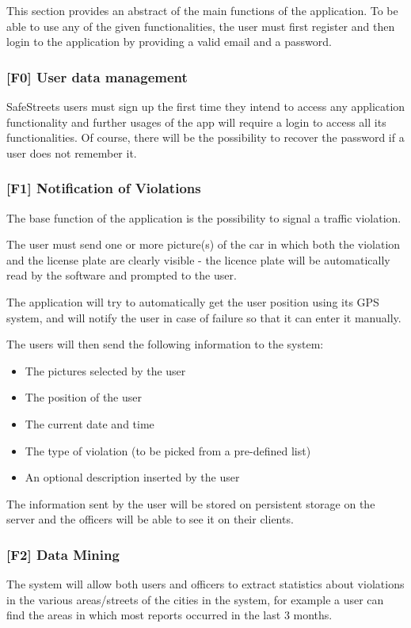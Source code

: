 This section provides an abstract of the main functions of the application. To be able to use any of the given functionalities, the user must first register and then login to the application by providing a valid email and a password.

\subsubsection[User data management]{[F0] User data management\hypertarget{sec:f0}{}}
SafeStreets users must sign up the first time they intend to access any application functionality and further usages of the app will require a login to access all its functionalities. Of course, there will be the possibility to recover the password if a user does not remember it.

\subsubsection[Notification of Violations]{[F1] Notification of Violations\hypertarget{sec:f1}{}}
\label{sec:notification_of_violations}
The base function of the application is the possibility to signal a traffic violation.

The user must send one or more picture(s) of the car in which both the violation and the license plate are clearly visible -
the licence plate will be automatically read by the software and prompted to the user.

The application will try to automatically get the user position using its GPS system, and will notify the user in case of failure so that it can enter it manually.

The users will then send the following information to the system:
\begin{itemize}
    \item The pictures selected by the user
    \item The position of the user
    \item The current date and time
    \item The type of violation (to be picked from a pre-defined list)
    \item An optional description inserted by the user
\end{itemize}
The information sent by the user will be stored on persistent storage on the server and the officers will be able to see it on their clients.

\subsubsection[Data Mining]{[F2] Data Mining\hypertarget{sec:f2}{}}
\label{sec:data_mining}
The system will allow both users and officers to extract statistics about violations in the various areas/streets of the cities in the system,
for example a user can find the areas in which most reports occurred in the last 3 months.

